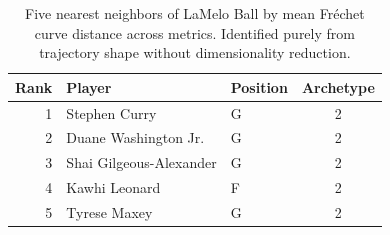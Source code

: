 \begin{table}[htbp]
  \centering\small
  \begin{tabular}{rllc}
    \toprule
    Rank & Player & Position & Archetype \\
    \midrule
    1 & Stephen Curry & G & 2 \\
    2 & Duane Washington Jr. & G & 2 \\
    3 & Shai Gilgeous-Alexander & G & 2 \\
    4 & Kawhi Leonard & F & 2 \\
    5 & Tyrese Maxey & G & 2 \\
    \bottomrule
  \end{tabular}
  \caption{Five nearest neighbors of LaMelo Ball by mean Fr\'{e}chet curve distance across metrics. Identified purely from trajectory shape without dimensionality reduction.}
  \label{tab:LaMelo_Ball_frechet_curve_neighbors}
\end{table}

